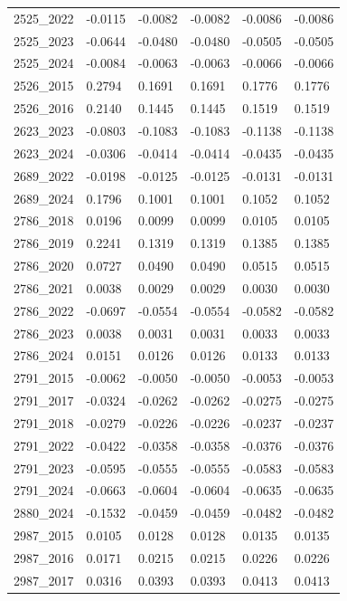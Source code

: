 \begin{table}[htbp]
\begin{tabular}{llllll}
2525_2022 & -0.0115 & -0.0082 & -0.0082 & -0.0086 & -0.0086 \\
2525_2023 & -0.0644 & -0.0480 & -0.0480 & -0.0505 & -0.0505 \\
2525_2024 & -0.0084 & -0.0063 & -0.0063 & -0.0066 & -0.0066 \\
2526_2015 & 0.2794 & 0.1691 & 0.1691 & 0.1776 & 0.1776 \\
2526_2016 & 0.2140 & 0.1445 & 0.1445 & 0.1519 & 0.1519 \\
2623_2023 & -0.0803 & -0.1083 & -0.1083 & -0.1138 & -0.1138 \\
2623_2024 & -0.0306 & -0.0414 & -0.0414 & -0.0435 & -0.0435 \\
2689_2022 & -0.0198 & -0.0125 & -0.0125 & -0.0131 & -0.0131 \\
2689_2024 & 0.1796 & 0.1001 & 0.1001 & 0.1052 & 0.1052 \\
2786_2018 & 0.0196 & 0.0099 & 0.0099 & 0.0105 & 0.0105 \\
2786_2019 & 0.2241 & 0.1319 & 0.1319 & 0.1385 & 0.1385 \\
2786_2020 & 0.0727 & 0.0490 & 0.0490 & 0.0515 & 0.0515 \\
2786_2021 & 0.0038 & 0.0029 & 0.0029 & 0.0030 & 0.0030 \\
2786_2022 & -0.0697 & -0.0554 & -0.0554 & -0.0582 & -0.0582 \\
2786_2023 & 0.0038 & 0.0031 & 0.0031 & 0.0033 & 0.0033 \\
2786_2024 & 0.0151 & 0.0126 & 0.0126 & 0.0133 & 0.0133 \\
2791_2015 & -0.0062 & -0.0050 & -0.0050 & -0.0053 & -0.0053 \\
2791_2017 & -0.0324 & -0.0262 & -0.0262 & -0.0275 & -0.0275 \\
2791_2018 & -0.0279 & -0.0226 & -0.0226 & -0.0237 & -0.0237 \\
2791_2022 & -0.0422 & -0.0358 & -0.0358 & -0.0376 & -0.0376 \\
2791_2023 & -0.0595 & -0.0555 & -0.0555 & -0.0583 & -0.0583 \\
2791_2024 & -0.0663 & -0.0604 & -0.0604 & -0.0635 & -0.0635 \\
2880_2024 & -0.1532 & -0.0459 & -0.0459 & -0.0482 & -0.0482 \\
2987_2015 & 0.0105 & 0.0128 & 0.0128 & 0.0135 & 0.0135 \\
2987_2016 & 0.0171 & 0.0215 & 0.0215 & 0.0226 & 0.0226 \\
2987_2017 & 0.0316 & 0.0393 & 0.0393 & 0.0413 & 0.0413 \\

\end{tabular}
\end{table}
